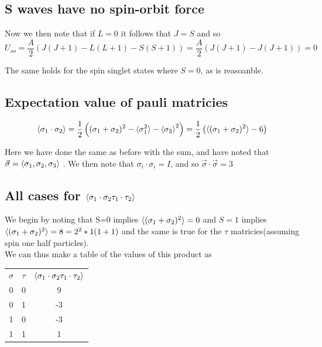 \documentclass[11pt]{article} %
\begin{document}
\subsection{S waves have no spin-orbit force}

Now we then note that if $L=0$ it follows that $J=S$ and so
\begin{equation}
U_{so}=\frac{A}{2}\left(J(J+1)-L(L+1)-S(S+1)\right)=\frac{A}{2}\left(J(J+1)-J(J+1)\right)=0\end{equation}

The same holds for the spin singlet states where $S=0$, as is reasoanble.\\

\subsection{Expectation value of pauli matricies}
\begin{equation}
\braket{\sigma_1 \cdot \sigma_2}=\frac{1}{2}\left((\sigma_1+\sigma_2)^2-\braket{\sigma_1^2}-\braket{\sigma_2}^2\right)
=\frac{1}{2} \left(\braket{(\sigma_1+\sigma_2)^2}-6\right)
\end{equation}

Here we have done the same as before with the sum, and have noted that $\vec{\sigma}=\braket{\sigma_1,\sigma_2,\sigma_3}$ . We then note that $\sigma_i \cdot \sigma_i =I$, and so $\vec{\sigma}\cdot \vec{\sigma}=3$

\subsection{All cases for $\braket{\sigma_1 \cdot \sigma_2 \tau_1 \cdot \tau_2}$}

We begin by noting that S=0 implies $\braket{(\sigma_1+\sigma_2)^2}=0$ and $S=1$ implies $\braket{(\sigma_1+\sigma_2)^2}=8=2^2*1(1+1)$ and the same is true for the $\tau$ matricies(assuming spin one half particles).\\

We can thus make a table of the values of this product as\\
\FloatBarrier
\begin{table}[bht!]
\centering
\begin{tabular}{c|c|c}
$\sigma$ & $\tau$ & $\braket{\sigma_1 \cdot \sigma_2 \tau_1 \cdot \tau_2}$\\
0 & 0 & 9\\
0 & 1 & -3\\
1 & 0 & -3\\
1 &1 &1
\end{tabular}
\end{table}
\end{document}
